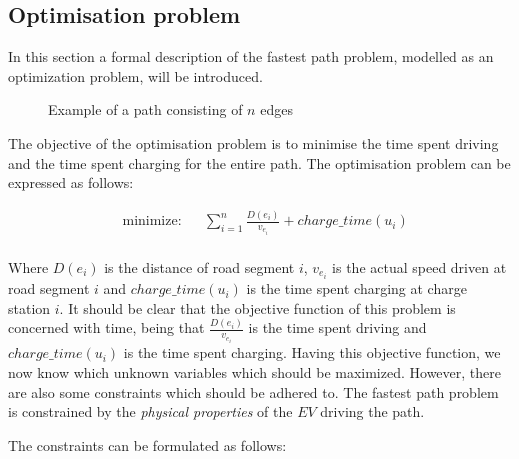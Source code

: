 \subsection{Optimisation problem}
In this section a formal description of the fastest path problem, modelled as an optimization problem, will be introduced.

\begin{figure}[h!]
\centering
    \caption{Example of a path consisting of $n$ edges} \label{fig:pathexample}
\end{figure} 


The objective of the optimisation problem is to minimise the time spent driving 
and the time spent charging for the entire path. The optimisation problem can be expressed as follows:

\begin{equation}
	\begin{aligned} & 
	{\text{minimize:}}
	& & \sum_{i=1}^{n} \frac{D(e_i)}{v_{e_i}} + charge\_time(u_i) \\
	\end{aligned}
\end{equation}\label{eq:objfunction}

Where $D(e_i)$ is the distance of road segment $i$, $v_{e_i}$ is the actual speed driven at road segment $i$ and $charge\_time(u_i)$ is the time spent charging at charge station $i$. It should be clear that the objective function of this problem is concerned with time, being that $\frac{D(e_i)}{v_{e_i}}$ is the time spent driving and $charge\_time(u_i)$ is the time spent charging. Having this objective function, we now know which unknown variables which should be maximized. However, there are also some constraints which should be adhered to. The fastest path problem is constrained by the \emph{physical properties} of the $EV$ driving the path.  

The constraints can be formulated as follows: \\

